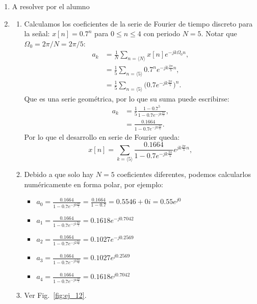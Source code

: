 \documentclass[10pt,a4paper]{article}
\begin{document}
\begin{enumerate}
\item A resolver por el alumno


\item 
\begin{enumerate}
	\item Calculamos los coeficientes de la serie de Fourier de tiempo discreto para la señal: $x[n]=0.7^n$ para 
	$0\leq n\leq 4$ con periodo $N=5$. Notar que $\Omega_0=2\pi/N=2\pi/5$:
	\begin{align}
	a_k &= \frac{1}{N} \sum_{n=\langle N\rangle} x[n]e^{-jk\Omega_0n},\\
	&= \frac{1}{5} \sum_{n=\langle 5\rangle} 0.7^n e^{-jk\frac{2\pi}{5}n},\\
    &= \frac{1}{5} \sum_{n=\langle 5\rangle} \Big( 0.7 e^{-jk\frac{2\pi}{5}} \Big) ^n.
   	\end{align}
	Que es una serie geométrica, por lo que su suma puede escribirse:
	\begin{align}
	a_k  &= \frac{1}{5}\frac{1-0.7^5}{1-0.7e^{-jk\frac{2\pi}{5}}},\\
	 &=\boxed{\frac{0.1664}{1-0.7e^{-jk\frac{2\pi}{5}}}}.
	\end{align}	
	 Por lo que el desarrollo en serie de Fourier queda:
	\begin{equation}
	x[n] = \sum_{k=\langle 5\rangle} \frac{0.1664}{1-0.7e^{-jk\frac{2\pi}{5}}} e^{jk\frac{2\pi}{5}n},
	\end{equation}
	\item Debido a que solo hay $N=5$ coeficientes diferentes, podemos calcularlos numéricamente en forma polar, por 
	ejemplo:
	\begin{itemize}
		\item $a_0=\frac{0.1664}{1-0.7e^{-j0\frac{2\pi}{5}}}=\frac{0.1664}{1-0.7}=0.5546+0i=0.55e^{j0}$
		\item $a_1=\frac{0.1664}{1-0.7e^{-j1\frac{2\pi}{5}}}=0.1618e^{-j0.7042}$
		\item $a_2=\frac{0.1664}{1-0.7e^{-j2\frac{2\pi}{5}}}=0.1027e^{-j0.2569}$
		\item $a_3=\frac{0.1664}{1-0.7e^{-j3\frac{2\pi}{5}}}=0.1027e^{j0.2569}$
		\item $a_4=\frac{0.1664}{1-0.7e^{-j4\frac{2\pi}{5}}}=0.1618e^{j0.7042}$						
	\end{itemize}
	\item Ver Fig.~\ref{fig:ej_12}.

\end{enumerate}
\end{enumerate}
\end{document}
